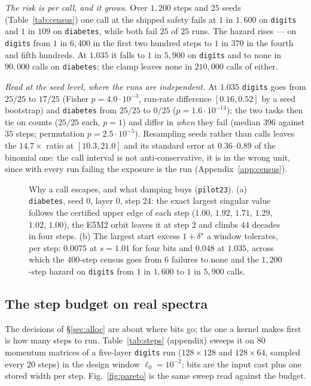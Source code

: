 \emph{The risk is per call, and it grows.}  Over $1{,}200$ steps and $25$ seeds
(Table~\ref{tab:census}) one call at the shipped safety fails at $1$ in $1{,}600$ on
\texttt{digits} and $1$ in $109$ on \texttt{diabetes}, while both fail $25$ of $25$ runs.
The hazard rises --- on \texttt{digits} from $1$ in $6{,}400$ in the first two
hundred steps to $1$ in $370$ in the fourth and fifth hundreds.  At $1.035$ it falls to $1$
in $5{,}900$ on \texttt{digits} and to none in $90{,}000$ calls on \texttt{diabetes}; the
clamp leaves none in $210{,}000$ calls of either.

\emph{Read at the seed level, where the runs are independent.}  At $1.035$ \texttt{digits}
goes from $25/25$ to $17/25$ (Fisher $p=4.0\cdot10^{-3}$, run-rate difference
$[0.16,0.52]$ by a seed bootstrap) and \texttt{diabetes} from $25/25$ to $0/25$
($p=1.6\cdot10^{-14}$); the two tasks then tie on counts ($25/25$ each, $p=1$) and differ in
\emph{when} they fail (median $396$ against $35$ steps; permutation $p=2.5\cdot10^{-5}$).
Resampling seeds rather than calls leaves the $14.7\times$ ratio at $[10.3,21.0]$ and its
standard error at $0.36$--$0.89$ of the binomial one: the call interval is not
anti-conservative, it is in the wrong unit, since with every run failing the exposure is
the run (Appendix~\ref{app:census}).

\begin{figure}[t]
\centering

\caption{Why a call escapes, and what damping buys (\texttt{pilot23}).
(a) \texttt{diabetes}, seed $0$, layer $0$, step $24$: the exact largest singular value
follows the certified upper edge of each step ($1.00$, $1.92$, $1.71$, $1.29$, $1.02$,
$1.00$), the E5M2 orbit leaves it at step $2$ and climbs $44$ decades in four steps.
(b) The largest start excess $1+\delta^\star$ a window tolerates, per step: $0.0075$ at
$s=1.01$ for four bits and $0.048$ at $1.035$, across which the $400$-step census goes from
$6$ failures to none and the $1{,}200$-step hazard on \texttt{digits} from $1$ in $1{,}600$
to $1$ in $5{,}900$ calls.}
\label{fig:escape}
\end{figure}

\subsection{The step budget on real spectra}
\label{sec:steps}

The decisions of \S\ref{sec:alloc} are about where bits go; the one a kernel makes first
is how many steps to run.  Table~\ref{tab:steps} (appendix) sweeps it on 80 momentum
matrices of a five-layer \texttt{digits} run ($128\times128$ and $128\times64$, sampled
every 20 steps) in the design window $\ell_0=10^{-2}$; bits are the input cast plus one
stored width per step.  Fig.~\ref{fig:pareto} is the same sweep read against the budget.

